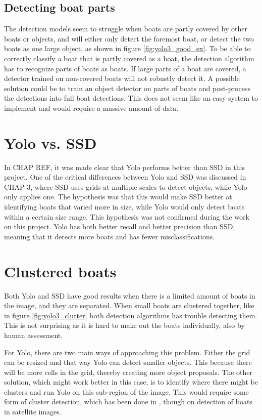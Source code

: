 \subsection{Detecting boat parts}
\label{sec:boat_parts}
The detection models seem to struggle when boats are partly covered by other boats or objects, and will either only detect the foremost boat, or detect the two boats as one large object, as shown in figure \ref{fig:yolo3_good_ex}. To be able to correctly classify a boat that is partly covered as a boat, the detection algorithm has to recognize parts of boats as boats. If large parts of a boat are covered, a detector trained on non-covered boats will not robustly detect it. A possible solution could be to train an object detector on parts of boats and post-process the detections into full boat detections. This does not seem like an easy system to implement and would require a massive amount of data. 



\section{Yolo vs. SSD}
In CHAP REF, it was made clear that Yolo performs better than SSD in this project. One of the critical differences between Yolo and SSD was discussed in CHAP 3, where SSD uses grids at multiple scales to detect objects, while Yolo only applies one. The hypothesis was that this would make SSD better at identifying boats that varied more in size, while Yolo would only detect boats within a certain size range. This hypothesis was not confirmed during the work on this project. Yolo has both better recall and better precision than SSD, meaning that it detects more boats and has fewer misclassifications.

\section{Clustered boats}
Both Yolo and SSD have good results when there is a limited amount of boats in the image, and they are separated. When small boats are clustered together, like in figure \ref{fig:yolo3_clutter} both detection algorithms has trouble detecting them. This is not surprising as it is hard to make out the boats individually, also by human assessment. 

\vspace{3mm}

For Yolo, there are two main ways of approaching this problem. Either the grid can be resized and that way Yolo can detect smaller objects. This because there will be more cells in the grid, thereby creating more object proposals. The other solution, which might work better in this case, is to identify where there might be clusters and run Yolo on this sub-region of the image. This would require some form of cluster detection, which has been done in \citep{VanEtten}, though on detection of boats in satellite images. 

